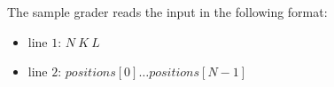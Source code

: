 The sample grader reads the input in the following format: 
\begin{itemize}
\item line $1$: $N\ K\ L$
\item line $2$: $positions[0] \ldots positions[N - 1]$
\end{itemize}
